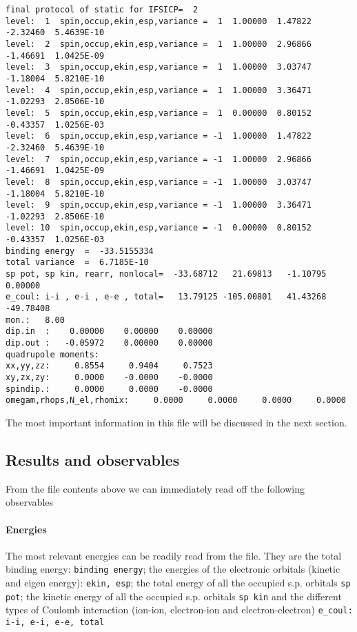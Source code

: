 \documentclass[11pt,a4paper]{article}
\begin{document}
\begin{Verbatim}[frame=single,label=pstat.H2O,fontsize=\footnotesize]
final protocol of static for IFSICP=  2
level:  1  spin,occup,ekin,esp,variance =  1  1.00000  1.47822 -2.32460  5.4639E-10
level:  2  spin,occup,ekin,esp,variance =  1  1.00000  2.96866 -1.46691  1.0425E-09
level:  3  spin,occup,ekin,esp,variance =  1  1.00000  3.03747 -1.18004  5.8210E-10
level:  4  spin,occup,ekin,esp,variance =  1  1.00000  3.36471 -1.02293  2.8506E-10
level:  5  spin,occup,ekin,esp,variance =  1  0.00000  0.80152 -0.43357  1.0256E-03
level:  6  spin,occup,ekin,esp,variance = -1  1.00000  1.47822 -2.32460  5.4639E-10
level:  7  spin,occup,ekin,esp,variance = -1  1.00000  2.96866 -1.46691  1.0425E-09
level:  8  spin,occup,ekin,esp,variance = -1  1.00000  3.03747 -1.18004  5.8210E-10
level:  9  spin,occup,ekin,esp,variance = -1  1.00000  3.36471 -1.02293  2.8506E-10
level: 10  spin,occup,ekin,esp,variance = -1  0.00000  0.80152 -0.43357  1.0256E-03
binding energy  =  -33.5155334
total variance  =  6.7185E-10
sp pot, sp kin, rearr, nonlocal=  -33.68712   21.69813   -1.10795    0.00000
e_coul: i-i , e-i , e-e , total=   13.79125 -105.00801   41.43268  -49.78408
mon.:   8.00
dip.in  :    0.00000    0.00000    0.00000
dip.out :   -0.05972    0.00000    0.00000
quadrupole moments:
xx,yy,zz:     0.8554     0.9404     0.7523
xy,zx,zy:     0.0000    -0.0000    -0.0000
spindip.:     0.0000     0.0000    -0.0000
omegam,rhops,N_el,rhomix:     0.0000     0.0000     0.0000     0.0000
\end{Verbatim}
		The most important information in this file will be discussed in the next section. 
		\subsection{Results and observables}
			From the file contents above we can immediately read off the following observables
			\paragraph{Energies} The most relevant energies can be readily read from the file. They are the total binding energy: \texttt{binding energy}; the energies of the electronic orbitals (kinetic and eigen energy): \texttt{ekin, esp}; the total energy of all the occupied s.p. orbitals \texttt{sp pot}; the kinetic energy of all the occupied s.p. orbitals \texttt{sp kin} and the different types of Coulomb interaction (ion-ion, electron-ion and electron-electron) \texttt{e\_coul: i-i, e-i, e-e, total}
			
\end{document}
